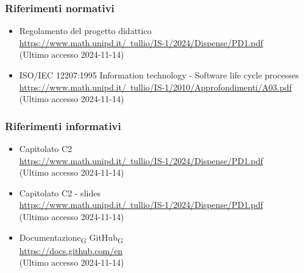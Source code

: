 \subsubsection{Riferimenti normativi}
\begin{itemize}
    \item Regolamento del progetto didattico\\ \href{https://www.math.unipd.it/~tullio/IS-1/2024/Dispense/PD1.pdf}{https://www.math.unipd.it/~tullio/IS-1/2024/Dispense/PD1.pdf} \\ (Ultimo accesso 2024-11-14)
    \item ISO/IEC 12207:1995 Information technology - Software life cycle processes \\ \href{https://www.math.unipd.it/~tullio/IS-1/2010/Approfondimenti/A03.pdf}{https://www.math.unipd.it/~tullio/IS-1/2010/Approfondimenti/A03.pdf}\\ (Ultimo accesso 2024-11-14)

\end{itemize}

\subsubsection{Riferimenti informativi}
\begin{itemize}
    \item Capitolato C2 \\ \href{https://www.math.unipd.it/~tullio/IS-1/2024/Dispense/PD1.pdf}{https://www.math.unipd.it/~tullio/IS-1/2024/Dispense/PD1.pdf}\\ (Ultimo accesso 2024-11-14)
    \item Capitolato C2 - slides \\ \href{https://www.math.unipd.it/~tullio/IS-1/2024/Dispense/PD1.pdf}{https://www.math.unipd.it/~tullio/IS-1/2024/Dispense/PD1.pdf}\\ (Ultimo accesso 2024-11-14)
    \item Documentazione\textsubscript{G} GitHub\textsubscript{G} \\ \href{https://docs.github.com/en}{https://docs.github.com/en}\\ (Ultimo accesso 2024-11-14)
    
\end{itemize}